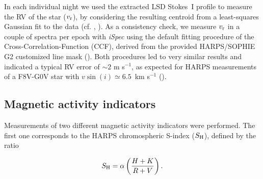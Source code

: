 \documentclass[a4paper,fleqn,usenatbib]{mnras}
\begin{document}
In each individual night we used the extracted LSD Stokes~I profile to measure the RV of the star ($v_{\rm r}$), by considering the resulting centroid from a least-squares Gaussian fit to the data (cf. , ). As a consistency check, we measure $v_{\rm r}$ in a couple of spectra per epoch with \textit{iSpec} using the default fitting procedure of the Cross-Correlation-Function (CCF), derived from the provided HARPS/SOPHIE G2 customized line mask (). Both procedures led to very similar results and indicated a typical RV error of $\sim$$2$ m s$^{-1}$, as expected for HARPS measurements of a F8V-G0V star with $v\sin(i) \simeq 6.5$~km s$^{-1}$ (). 

\subsection{Magnetic activity indicators}\label{sec_activity}

Measurements of two different magnetic activity indicators were performed. The first one corresponds to the HARPS chromospheric S-index ($S_{\rm H}$), defined by the ratio

\begin{equation}\label{eq1}
S_{\rm H} = \alpha\left(\dfrac{H+K}{R+V}\right)\mbox{.}
\end{equation}
\end{document}

